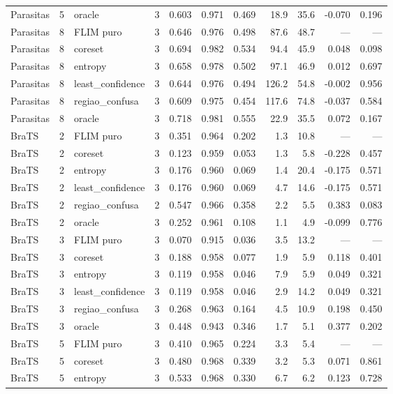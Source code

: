 \begin{tabular}{lllrrrrrrrr}
Parasitas & 5 & oracle & 3 & 0.603 & 0.971 & 0.469 & 18.9 & 35.6 & -0.070 & 0.196 \\
Parasitas & 8 & FLIM puro & 3 & 0.646 & 0.976 & 0.498 & 87.6 & 48.7 & --- & --- \\
Parasitas & 8 & coreset & 3 & 0.694 & 0.982 & 0.534 & 94.4 & 45.9 & 0.048 & 0.098 \\
Parasitas & 8 & entropy & 3 & 0.658 & 0.978 & 0.502 & 97.1 & 46.9 & 0.012 & 0.697 \\
Parasitas & 8 & least\_confidence & 3 & 0.644 & 0.976 & 0.494 & 126.2 & 54.8 & -0.002 & 0.956 \\
Parasitas & 8 & regiao\_confusa & 3 & 0.609 & 0.975 & 0.454 & 117.6 & 74.8 & -0.037 & 0.584 \\
Parasitas & 8 & oracle & 3 & 0.718 & 0.981 & 0.555 & 22.9 & 35.5 & 0.072 & 0.167 \\
BraTS & 2 & FLIM puro & 3 & 0.351 & 0.964 & 0.202 & 1.3 & 10.8 & --- & --- \\
BraTS & 2 & coreset & 3 & 0.123 & 0.959 & 0.053 & 1.3 & 5.8 & -0.228 & 0.457 \\
BraTS & 2 & entropy & 3 & 0.176 & 0.960 & 0.069 & 1.4 & 20.4 & -0.175 & 0.571 \\
BraTS & 2 & least\_confidence & 3 & 0.176 & 0.960 & 0.069 & 4.7 & 14.6 & -0.175 & 0.571 \\
BraTS & 2 & regiao\_confusa & 2 & 0.547 & 0.966 & 0.358 & 2.2 & 5.5 & 0.383 & 0.083 \\
BraTS & 2 & oracle & 3 & 0.252 & 0.961 & 0.108 & 1.1 & 4.9 & -0.099 & 0.776 \\
BraTS & 3 & FLIM puro & 3 & 0.070 & 0.915 & 0.036 & 3.5 & 13.2 & --- & --- \\
BraTS & 3 & coreset & 3 & 0.188 & 0.958 & 0.077 & 1.9 & 5.9 & 0.118 & 0.401 \\
BraTS & 3 & entropy & 3 & 0.119 & 0.958 & 0.046 & 7.9 & 5.9 & 0.049 & 0.321 \\
BraTS & 3 & least\_confidence & 3 & 0.119 & 0.958 & 0.046 & 2.9 & 14.2 & 0.049 & 0.321 \\
BraTS & 3 & regiao\_confusa & 3 & 0.268 & 0.963 & 0.164 & 4.5 & 10.9 & 0.198 & 0.450 \\
BraTS & 3 & oracle & 3 & 0.448 & 0.943 & 0.346 & 1.7 & 5.1 & 0.377 & 0.202 \\
BraTS & 5 & FLIM puro & 3 & 0.410 & 0.965 & 0.224 & 3.3 & 5.4 & --- & --- \\
BraTS & 5 & coreset & 3 & 0.480 & 0.968 & 0.339 & 3.2 & 5.3 & 0.071 & 0.861 \\
BraTS & 5 & entropy & 3 & 0.533 & 0.968 & 0.330 & 6.7 & 6.2 & 0.123 & 0.728 \\

\end{tabular}
